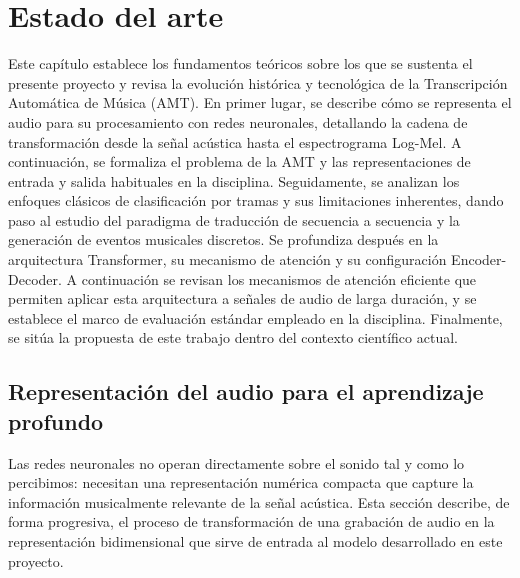  
\chapter{Estado del arte}
\label{cap:estado_del_arte}
 
Este capítulo establece los fundamentos teóricos sobre los que se sustenta
el presente proyecto y revisa la evolución histórica y tecnológica de la
Transcripción Automática de Música (AMT). En primer lugar, se describe
cómo se representa el audio para su procesamiento con redes neuronales,
detallando la cadena de transformación desde la señal acústica hasta el
espectrograma Log-Mel. A continuación, se formaliza el problema de la AMT
y las representaciones de entrada y salida habituales en la disciplina.
Seguidamente, se analizan los enfoques clásicos de clasificación por
tramas y sus limitaciones inherentes, dando paso al estudio del paradigma
de traducción de secuencia a secuencia y la generación de eventos
musicales discretos. Se profundiza después en la arquitectura Transformer,
su mecanismo de atención y su configuración Encoder-Decoder. A
continuación se revisan los mecanismos de atención eficiente que permiten
aplicar esta arquitectura a señales de audio de larga duración, y se
establece el marco de evaluación estándar empleado en la disciplina.
Finalmente, se sitúa la propuesta de este trabajo dentro del contexto
científico actual.
 
\section{Representación del audio para el aprendizaje profundo}
\label{sec:representacion_audio}

Las redes neuronales no operan directamente sobre el sonido tal y como
lo percibimos: necesitan una representación numérica compacta que capture
la información musicalmente relevante de la señal acústica. Esta sección
describe, de forma progresiva, el proceso de transformación de una
grabación de audio en la representación bidimensional que sirve de
entrada al modelo desarrollado en este proyecto.

